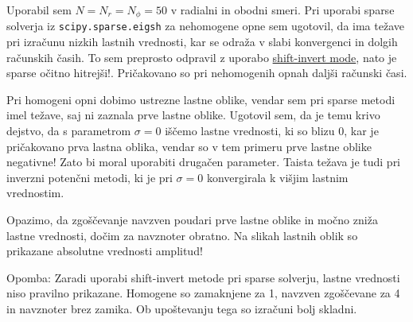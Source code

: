 Uporabil sem $N=N_r=N_{\phi}=50$ v radialni in obodni smeri. Pri uporabi sparse solverja iz \texttt{scipy.sparse.eigsh} za nehomogene opne sem ugotovil, da ima težave pri izračunu nizkih lastnih vrednosti, kar se odraža v slabi konvergenci in dolgih računskih časih. To sem preprosto odpravil z uporabo \href{https://docs.scipy.org/doc/scipy/tutorial/arpack.html} {shift-invert mode}, nato je sparse očitno hitrejši!. Pričakovano so pri nehomogenih opnah daljši računski časi.

Pri homogeni opni dobimo ustrezne lastne oblike, vendar sem pri sparse metodi imel težave, saj ni zaznala prve lastne oblike. Ugotovil sem, da je temu krivo dejstvo, da s parametrom $\sigma=0$ iščemo lastne vrednosti, ki so blizu 0, kar je pričakovano prva lastna oblika, vendar so v tem primeru prve lastne oblike negativne! Zato bi moral uporabiti  drugačen parameter. Taista težava je tudi pri inverzni potenčni metodi, ki je pri $\sigma=0$ konvergirala k višjim lastnim vrednostim.

Opazimo, da zgoščevanje navzven poudari prve lastne oblike in močno zniža lastne vrednosti, dočim za navznoter obratno. Na slikah lastnih oblik so prikazane absolutne vrednosti amplitud!



Opomba: Zaradi uporabi shift-invert metode pri sparse solverju, lastne vrednosti niso pravilno prikazane. Homogene so zamaknjene za 1, navzven zgoščevane za 4 in navznoter brez zamika. Ob upoštevanju tega so izračuni bolj skladni.

